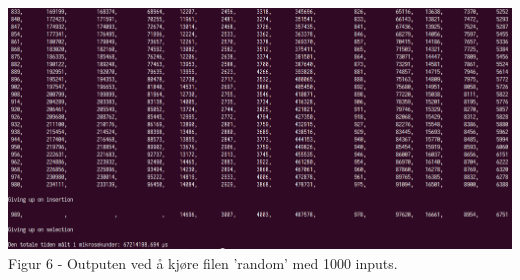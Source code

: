 \documentclass[a4paper, article, oneside, norsk]{memoir} %
\newcommand{\0}{\mathbf{0}}
\newcommand{\1}{\mathbf{1}}
\begin{document}
\\
\includegraphics[scale=0.2]{IN2010oblig3_oppgave2d.png}
\\
Figur 6 - Outputen ved å kjøre filen 'random' med 1000 inputs.
\\
\end{document}

